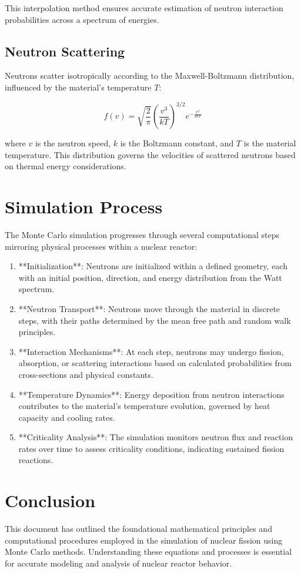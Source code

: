 \documentclass{article}
\begin{document}
This interpolation method ensures accurate estimation of neutron interaction probabilities across a spectrum of energies.

\subsection{Neutron Scattering}

Neutrons scatter isotropically according to the Maxwell-Boltzmann distribution, influenced by the material's temperature \( T \):

\begin{equation}
f(v) = \sqrt{\frac{2}{\pi}} \left(\frac{v^3}{kT}\right)^{3/2} e^{-\frac{v^2}{2kT}}
\end{equation}

where \( v \) is the neutron speed, \( k \) is the Boltzmann constant, and \( T \) is the material temperature. This distribution governs the velocities of scattered neutrons based on thermal energy considerations.

\section{Simulation Process}

The Monte Carlo simulation progresses through several computational steps mirroring physical processes within a nuclear reactor:

\begin{enumerate}
    \item **Initialization**: Neutrons are initialized within a defined geometry, each with an initial position, direction, and energy distribution from the Watt spectrum.
    \item **Neutron Transport**: Neutrons move through the material in discrete steps, with their paths determined by the mean free path and random walk principles.
    \item **Interaction Mechanisms**: At each step, neutrons may undergo fission, absorption, or scattering interactions based on calculated probabilities from cross-sections and physical constants.
    \item **Temperature Dynamics**: Energy deposition from neutron interactions contributes to the material's temperature evolution, governed by heat capacity and cooling rates.
    \item **Criticality Analysis**: The simulation monitors neutron flux and reaction rates over time to assess criticality conditions, indicating sustained fission reactions.
\end{enumerate}

\section{Conclusion}

This document has outlined the foundational mathematical principles and computational procedures employed in the simulation of nuclear fission using Monte Carlo methods. Understanding these equations and processes is essential for accurate modeling and analysis of nuclear reactor behavior.
\end{document}
